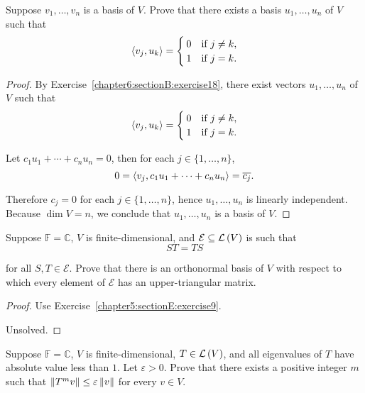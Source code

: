 \begin{exercise}
    Suppose $v_{1}, \ldots, v_{n}$ is a basis of $V$. Prove that there exists a basis $u_{1}, \ldots, u_{n}$ of $V$ such that
    \[
        \left\langle{v_{j}, u_{k}}\right\rangle = \begin{cases}
            0 & \text{if $j\ne k$}, \\
            1 & \text{if $j = k$}.
        \end{cases}
    \]
\end{exercise}

\begin{proof}
    By Exercise~\ref{chapter6:sectionB:exercise18}, there exist vectors $u_{1}, \ldots, u_{n}$ of $V$ such that
    \[
        \left\langle{v_{j}, u_{k}}\right\rangle = \begin{cases}
            0 & \text{if $j\ne k$}, \\
            1 & \text{if $j = k$}.
        \end{cases}
    \]

    Let $c_{1}u_{1} + \cdots + c_{n}u_{n} = 0$, then for each $j\in\{1,\ldots, n\}$,
    \[
        0 = \left\langle{v_{j}, c_{1}u_{1} + \cdots + c_{n}u_{n}}\right\rangle = \overline{c_{j}}.
    \]

    Therefore $c_{j} = 0$ for each $j\in\{1,\ldots, n\}$, hence $u_{1}, \ldots, u_{n}$ is linearly independent. Because $\dim V = n$, we conclude that $u_{1}, \ldots, u_{n}$ is a basis of $V$.
\end{proof}
\newpage

\begin{exercise}\label{chapter6:sectionB:exercise20}
    Suppose $\mathbb{F} = \mathbb{C}$, $V$ is finite-dimensional, and $\mathcal{E} \subseteq \mathcal{L}\left({V}\right)$ is such that
    \[
        ST = TS
    \]

    for all $S, T\in\mathcal{E}$. Prove that there is an orthonormal basis of $V$ with respect to which every element of $\mathcal{E}$ has an upper-triangular matrix.
\end{exercise}

\begin{proof}
    Use Exercise~\ref{chapter5:sectionE:exercise9}.

    Unsolved.
\end{proof}
\newpage

\begin{exercise}
    Suppose $\mathbb{F} = \mathbb{C}$, $V$ is finite-dimensional, $T\in\mathcal{L}\left({V}\right)$, and all eigenvalues of $T$ have absolute value less than $1$. Let $\varepsilon > 0$. Prove that there exists a positive integer $m$ such that $\left\Vert{T^{m}v}\right\Vert\leq \varepsilon \left\Vert{v}\right\Vert$ for every $v\in V$.
\end{exercise}

